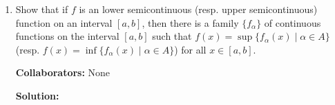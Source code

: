 \documentclass{article}%
\begin{document}
\begin{enumerate}
\item Show that if $f$ is an lower semicontinuous (resp. upper semicontinuous) function on an interval $[a,b]$, then there is a family $\{f_{\alpha}\}$ of continuous functions on the interval $[a,b]$ such that $f(x) = \sup\{f_{\alpha}(x) \mid \alpha \in A \}$ (resp. $f(x) = \inf\{f_{\alpha}(x) \mid \alpha \in A \}$) for all $x \in [a,b]$.  


\bigskip
\textbf{Collaborators:} None
\smallskip
 
\textbf{Solution:}

\bigskip






\end{enumerate}
\end{document}
